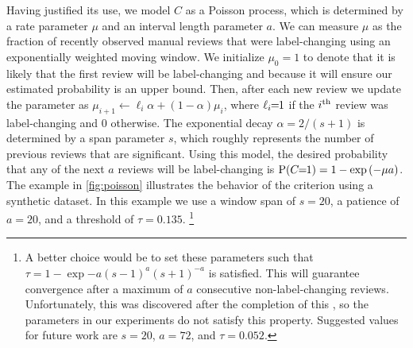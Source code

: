 Having justified its use, we model $C$ as a Poisson process, which is determined by a rate parameter $\mu$ and an
  interval length parameter $a$.
We can measure $\mu$ as the fraction of recently observed manual reviews that were label-changing using an
  exponentially weighted moving window.
We initialize $\mu_0=1$ to denote that it is likely that the first review will be label-changing and because it
  will ensure our estimated probability is an upper bound.
Then, after each new review we update the parameter as %
$\mu_{i + 1} \leftarrow \ell_i \alpha + (1 - \alpha) \mu_{i}$, where $\ell_i\mkern-6mu=\mkern-6mu1$ if the $i^{\textrm{th}}$ review was
  label-changing and $0$ otherwise.
The exponential decay $\alpha = 2 / (s + 1)$ is determined by a span parameter $s$, which roughly represents the
  number of previous reviews that are significant.
Using this model, the desired probability that any of the next $a$ reviews will be label-changing is %
$\mathbin{\operatorname{P}}(C\mkern-6mu=\mkern-6mu1) = 1 - \textrm{exp}\left(-\mu  a\right)$.
The example in \cref{fig:poisson} illustrates the behavior of the criterion using a synthetic dataset.
In this example we use a window span of $s=20$, a patience of $a=20$, and a threshold of $\tau=0.135$. \footnote{
    A better choice would be to set these parameters such that %
    $\tau = 1 - \exp{-a \left(s - 1\right)^{a} \left(s + 1\right)^{- a}}$ is satisfied.
    This will guarantee convergence after a maximum of $a$ consecutive non-label-changing reviews.
    Unfortunately, this was discovered after the completion of this \thesis{}, so the parameters in our
      experiments do not satisfy this property.
    Suggested values for future work are $s=20$, $a=72$, and $\tau=0.052$.
}




\begin{comment}
Another alternative might be measuring once the advantages from the ranking
algorithm become indistinguishable from a brute force search.


Let $D = \binom{|V|}{2}$ be the number of edges in the dataset and let $N=\sum_{C \in \set{C}} (|C| - 1)$ the
  number of edges in the MSTs of all PCCs.
We can measure the density of meaninful reviews in the current labeled dataset as $N/D$.

After our estimated mu gets close enough to $N/D$, we can terminate.

\end{comment}

